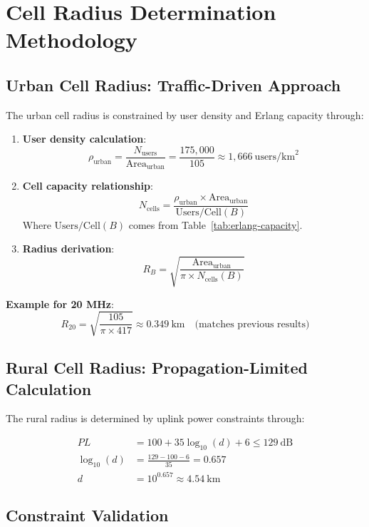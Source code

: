\documentclass[a4paper,12pt]{article}
\begin{document}
\section{Cell Radius Determination Methodology}
\label{sec:radius-method}

\subsection*{Urban Cell Radius: Traffic-Driven Approach}

The urban cell radius is constrained by user density and Erlang capacity through:

\begin{enumerate}
    \item \textbf{User density calculation}:
    \[
    \rho_{\text{urban}} = \frac{N_{\text{users}}}{\text{Area}_{\text{urban}}} = \frac{175,\!000}{105} \approx 1,\!666\ \text{users/km}^2
    \]
    
    \item \textbf{Cell capacity relationship}:
    \[
    N_{\text{cells}} = \frac{\rho_{\text{urban}} \times \text{Area}_{\text{urban}}}{\text{Users/Cell}(B)} 
    \]
    Where $\text{Users/Cell}(B)$ comes from Table~\ref{tab:erlang-capacity}.
    
    \item \textbf{Radius derivation}:
    \[
    R_B = \sqrt{\frac{\text{Area}_{\text{urban}}}{\pi \times N_{\text{cells}}(B)}}
    \]
\end{enumerate}

\textbf{Example for 20 MHz}:
\[
R_{20} = \sqrt{\frac{105}{\pi \times 417}} \approx 0.349\ \text{km} \quad \text{(matches previous results)}
\]

\subsection*{Rural Cell Radius: Propagation-Limited Calculation}

The rural radius is determined by uplink power constraints through:

\begin{align*}
PL &= 100 + 35\log_{10}(d) + 6 \leq 129\ \text{dB} \\
\log_{10}(d) &= \frac{129 - 100 - 6}{35} = 0.657 \\
d &= 10^{0.657} \approx 4.54\ \text{km}
\end{align*}

\subsection*{Constraint Validation}
\end{document}
